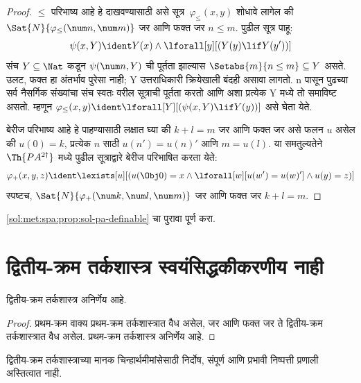 \begin{proof}
$\le$ परिभाष्य आहे हे दाखवण्यासाठी असे
सूत्र~$\varphi_\le(x, y)$ शोधावे लागेल की
$\Sat{N}{\varphi_\le(\num n, \num m)}$ जर आणि फक्त जर
$n \le m$. पुढील सूत्र पाहू:
\[\psi(x, Y) \ident Y(x) \land \lforall[y][(Y(y) \lif Y(y'))]
\]
संच $Y \subseteq \Nat$ कडून $\psi(\num n, Y)$ ची
पूर्तता झाल्यास $\Setabs{m}{n \le m} \subseteq Y$ असते.
उलट, फक्त हा अंतर्भाव पुरेसा नाही; Y उत्तराधिकारी क्रियेखाली
बंदही असावा लागतो. n पासून पुढच्या सर्व नैसर्गिक संख्यांचा
संच स्वतः वरील सूत्राची पूर्तता करतो आणि अशा प्रत्येक Y मध्ये
तो समाविष्ट असतो. म्हणून
$\varphi_\le(x, y) \ident
\lforall[Y][(\psi(x, Y) \lif Y(y))]$ असे घेता येते.

बेरीज परिभाष्य आहे हे पाहण्यासाठी लक्षात घ्या की $k+l=m$
जर आणि फक्त जर असे फलन $u$ असेल की $u(0)=k$,
प्रत्येक $n$ साठी $u(n')=u(n)'$ आणि $m = u(l)$.
या समतुल्यतेने $\Th{PA^{2\dagger}}$ मध्ये पुढील
सूत्राद्वारे बेरीज परिभाषित करता येते:
\[\varphi_+(x,y,z) \ident \lexists[u][(u(\Obj 0)=x \land \lforall[w][u(w')=u
 (w)'] \land u(y)=z)]
\]
स्पष्टच, $\Sat{N}{\varphi_+(\num k, \num l, \num m)}$
जर आणि फक्त जर $k+l=m$.
\end{proof}

\begin{prob}
\ref{sol:met:spa:prop:sol-pa-definable} चा पुरावा पूर्ण करा.
\end{prob}












\section{द्वितीय-क्रम तर्कशास्त्र स्वयंसिद्धकीकरणीय नाही}\label{sol:met:nax:sec}


\begin{thm}
\label{sol:met:nax:thm:sol-undecidable}
द्वितीय-क्रम तर्कशास्त्र अनिर्णेय आहे.
\end{thm}

\begin{proof}
प्रथम-क्रम वाक्य प्रथम-क्रम तर्कशास्त्रात वैध असेल,
जर आणि फक्त जर ते द्वितीय-क्रम तर्कशास्त्रात वैध असेल.
प्रथम-क्रम तर्कशास्त्र अनिर्णेय आहे.
\end{proof}

\begin{thm}
\label{sol:met:nax:cor:sol-not-axiomatizable}
द्वितीय-क्रम तर्कशास्त्राच्या मानक चिन्हार्थमीमांसेसाठी
निर्दोष, संपूर्ण आणि प्रभावी निष्पत्ती प्रणाली अस्तित्वात नाही.
\end{thm}

